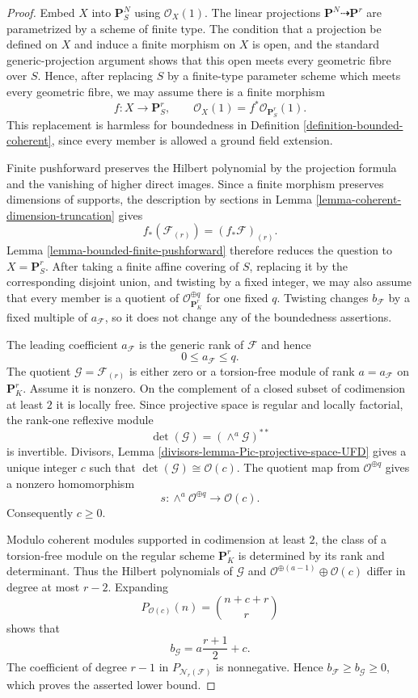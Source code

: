 \begin{proof}
Embed $X$ into $\mathbf{P}^N_S$ using $\mathcal{O}_X(1)$. The linear
projections $\mathbf{P}^N\dashrightarrow\mathbf{P}^r$ are parametrized by a
scheme of finite type. The condition that a projection be defined on $X$ and
induce a finite morphism on $X$ is open, and the standard generic-projection
argument shows that this open meets every geometric fibre over $S$. Hence,
after replacing $S$ by a finite-type parameter scheme which meets every
geometric fibre, we may assume there is a finite morphism
$$
f:X\longrightarrow\mathbf{P}^r_S,
\qquad
\mathcal{O}_X(1)=f^*\mathcal{O}_{\mathbf{P}^r_S}(1).
$$
This replacement is harmless for boundedness in Definition
\ref{definition-bounded-coherent}, since every member is allowed a ground
field extension.

Finite pushforward preserves the Hilbert polynomial by the projection formula
and the vanishing of higher direct images. Since a finite morphism preserves
dimensions of supports, the description by sections in Lemma
\ref{lemma-coherent-dimension-truncation} gives
$$
f_*(\mathcal{F}_{(r)})=(f_*\mathcal{F})_{(r)}.
$$
Lemma \ref{lemma-bounded-finite-pushforward} therefore reduces the question to
$X=\mathbf{P}^r_S$. After taking a finite affine covering of $S$, replacing it
by the corresponding disjoint union, and twisting by a fixed integer, we may
also assume that every member is a quotient of
$\mathcal{O}_{\mathbf{P}^r_K}^{\oplus q}$ for one fixed $q$. Twisting changes
$b_{\mathcal{F}}$ by a fixed multiple of $a_{\mathcal{F}}$, so it does not
change any of the boundedness assertions.

The leading coefficient $a_{\mathcal{F}}$ is the generic rank of
$\mathcal{F}$ and hence
$$
0\leq a_{\mathcal{F}}\leq q.
$$
The quotient $\mathcal{G}=\mathcal{F}_{(r)}$ is either zero or a torsion-free
module of rank $a=a_{\mathcal{F}}$ on $\mathbf{P}^r_K$. Assume it is nonzero.
On the complement of a closed subset of codimension at least $2$ it is
locally free. Since projective space is regular and locally factorial, the
rank-one reflexive module
$$
\det(\mathcal{G})=(\wedge^a\mathcal{G})^{**}
$$
is invertible. Divisors, Lemma
\ref{divisors-lemma-Pic-projective-space-UFD} gives a unique integer $c$ such
that $\det(\mathcal{G})\cong\mathcal{O}(c)$. The quotient map from
$\mathcal{O}^{\oplus q}$ gives a nonzero homomorphism
$$
s:\wedge^a\mathcal{O}^{\oplus q}\longrightarrow\mathcal{O}(c).
$$
Consequently $c\geq0$.

Modulo coherent modules supported in codimension at least $2$, the class of a
torsion-free module on the regular scheme $\mathbf{P}^r_K$ is determined by
its rank and determinant. Thus the Hilbert polynomials of $\mathcal{G}$ and
$\mathcal{O}^{\oplus(a-1)}\oplus\mathcal{O}(c)$ differ in degree at most
$r-2$. Expanding
$$
P_{\mathcal{O}(c)}(n)={n+c+r\choose r}
$$
shows that
$$
b_{\mathcal{G}}=a\frac{r+1}{2}+c.
$$
The coefficient of degree $r-1$ in
$P_{\mathcal{N}_r(\mathcal{F})}$ is nonnegative. Hence
$b_{\mathcal{F}}\geq b_{\mathcal{G}}\geq0$, which proves the asserted lower
bound.


\end{proof}

